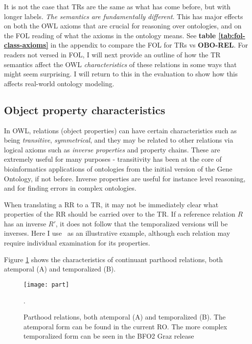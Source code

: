 \documentclass{bioinfo}
\def\partOf{\pr{part\_of}}
\def\OBOREL{\textbf{OBO-REL}}
\begin{document}
It is not the case that TRs are the same as what has come before, but
with longer labels. \emph{The semantics are fundamentally different}.
This has major effects on both the OWL axioms that are crucial for
reasoning over ontologies, and on the FOL reading of what the axioms
in the ontology means. See \textbf{table \ref{tab:fol-class-axioms}}
in the appendix to compare the FOL for TRs vs \OBOREL. For readers not
versed in FOL, I will next provide an outline of how the TR semantics
affect the OWL \emph{characteristics} of these relations in some ways
that might seem surprising. I will return to this in the evaluation to
show how this affects real-world ontology modeling.

\subsection{Object property characteristics}

In OWL, relations (object properties) can have certain characteristics
such as being \emph{transitive}, \emph{symmetrical}, and they may be
related to other relations via logical axioms such as \emph{inverse
  properties} and property chains. These are extremely useful for many
purposes - transitivity has been at the core of bioinformatics
applications of ontologies from the initial version of the Gene
Ontology\cite{Ashburner2000}, if not before. Inverse properties are
useful for instance level reasoning, and for finding errors in complex
ontologies.

When translating a RR to a TR, it may not be immediately clear what
properties of the RR should be carried over to the TR. If a reference
relation $R$ has an inverse $R'$, it does not follow that the
temporalized versions will be inverses. Here I use \partOf\ as an
illustrative example, although each relation may require individual
examination for its properties.

Figure \ref{fig:part} shows the characteristics of continuant parthood
relations, both atemporal (A) and temporalized (B).

\begin{figure}
\center
\texttt{[image: part]}
\caption{Parthood relations, both atemporal (A) and temporalized
  (B). The atemporal form can be found in the current RO. The more
  complex temporalized form can be seen in the BFO2 Graz release}.
\label{fig:part}
\end{figure}
\end{document}

